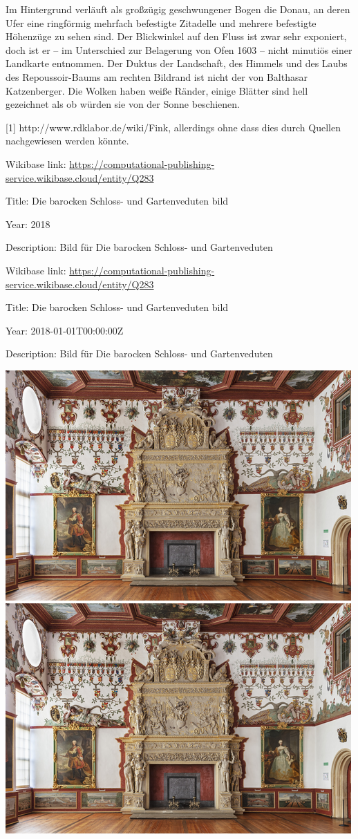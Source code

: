\documentclass[
  11pt,
  a4paper,
  openany]{book}
\begin{document}
Im Hintergrund verläuft als großzügig geschwungener Bogen die Donau, an
deren Ufer eine ringförmig mehrfach befestigte Zitadelle und mehrere
befestigte Höhenzüge zu sehen sind. Der Blickwinkel auf den Fluss ist
zwar sehr exponiert, doch ist er -- im Unterschied zur Belagerung von
Ofen 1603 -- nicht minutiös einer Landkarte entnommen. Der Duktus der
Landschaft, des Himmels und des Laubs des Repoussoir-Baums am rechten
Bildrand ist nicht der von Balthasar Katzenberger. Die Wolken haben
weiße Ränder, einige Blätter sind hell gezeichnet als ob würden sie von
der Sonne beschienen.

{[}1{]} http://www.rdklabor.de/wiki/Fink, allerdings ohne dass dies
durch Quellen nachgewiesen werden könnte.

Wikibase link:
\url{https://computational-publishing-service.wikibase.cloud/entity/Q283}

Title: Die barocken Schloss- und Gartenveduten bild

Year: 2018

Description: Bild für Die barocken Schloss- und Gartenveduten

Wikibase link:
\url{https://computational-publishing-service.wikibase.cloud/entity/Q283}

Title: Die barocken Schloss- und Gartenveduten bild

Year: 2018-01-01T00:00:00Z

Description: Bild für Die barocken Schloss- und Gartenveduten

\includegraphics{section_files/figure-pdf/cell-4-output-2.png}
\includegraphics{section_files/figure-pdf/cell-4-output-3.png}
\end{document}
